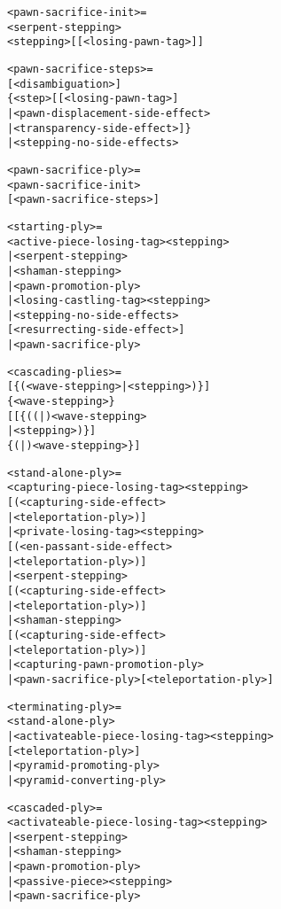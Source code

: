 \begin{alltt}
<pawn-sacrifice-init> =
  <serpent-stepping>
  <stepping>[\alg{*}[<losing-pawn-tag>]]\alg{;;}

<pawn-sacrifice-steps> =
  [<disambiguation>]
    \{<step>[\alg{*}[<losing-pawn-tag>]
            | <pawn-displacement-side-effect>
            | <transparency-side-effect>]\}
| <stepping-no-side-effects>

<pawn-sacrifice-ply> =
  <pawn-sacrifice-init>
  [<pawn-sacrifice-steps>]

<starting-ply> =
  <active-piece-losing-tag><stepping>
| <serpent-stepping>
| <shaman-stepping>
| <pawn-promotion-ply>
| <losing-castling-tag><stepping>
| <stepping-no-side-effects>
    [<resurrecting-side-effect>]
| <pawn-sacrifice-ply>

<cascading-plies> =
  [\{(<wave-stepping> | <stepping>)\}]
  \{<wave-stepping>\}
  [ [\{((\alg{~}|\alg{|})<wave-stepping>
       | <stepping>)\}]
    \{(\alg{~}|\alg{|})<wave-stepping>\} ]
\end{alltt}

\clearpage %

\begin{alltt}
<stand-alone-ply> =
  <capturing-piece-losing-tag><stepping>
  [(<capturing-side-effect>
    | <teleportation-ply>)]
| <private-losing-tag><stepping>
  [(<en-passant-side-effect>
    | <teleportation-ply>)]
| <serpent-stepping>
  [(<capturing-side-effect>
    | <teleportation-ply>)]
| <shaman-stepping>
  [(<capturing-side-effect>
    | <teleportation-ply>)]
| <capturing-pawn-promotion-ply>
| <pawn-sacrifice-ply>[<teleportation-ply>]

<terminating-ply> =
  <stand-alone-ply>
| <activateable-piece-losing-tag><stepping>
  [<teleportation-ply>]
| <pyramid-promoting-ply>
| <pyramid-converting-ply>

<cascaded-ply> =
  <activateable-piece-losing-tag><stepping>
| <serpent-stepping>
| <shaman-stepping>
| <pawn-promotion-ply>
| <passive-piece><stepping>
| <pawn-sacrifice-ply>
\end{alltt}

\clearpage %


